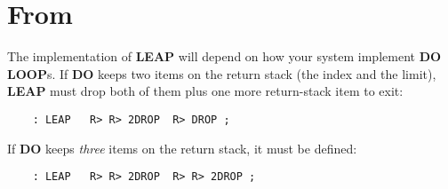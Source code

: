 \section{From }

The implementation of {\bf LEAP} will depend on how your system 
implement {\bf DO LOOP}s.  If {\bf DO} keeps two items on the return stack (the
index and the limit), {\bf LEAP} must drop both of them plus one more
return-stack item to exit:
\begin{verbatim}
    : LEAP   R> R> 2DROP  R> DROP ;
\end{verbatim}
If {\bf DO} keeps \emph{three} items on the return stack, it must be defined: 
\begin{verbatim}
    : LEAP   R> R> 2DROP  R> R> 2DROP ;
\end{verbatim}

